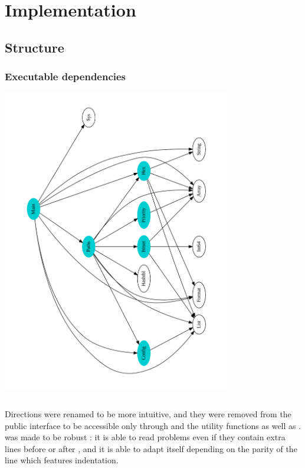 \section{Implementation}


\subsection{Structure}

\subsubsection*{Executable dependencies}
\begin{center}
\includegraphics[width=10cm,angle=-90]{exec-deps.pdf}
\end{center}


\subsection{}

Directions were renamed to be more intuitive, and they were removed
from the public interface to be accessible only through 
and the utility functions  as well as .\\

 was made to be robust : it is able to read problems even
if they contain extra lines before  or after ,
and it is able to adapt itself depending on the parity of the line which
features indentation.


